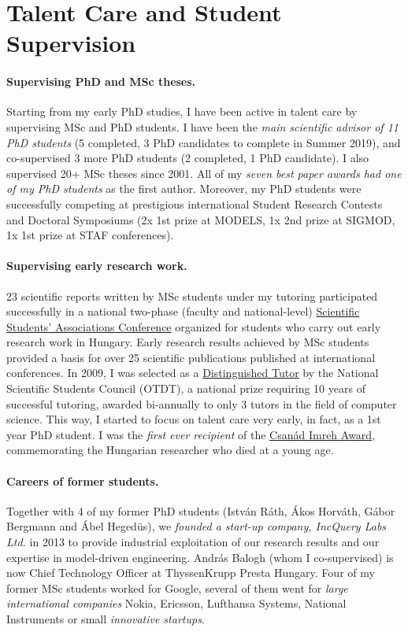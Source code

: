\documentclass[a4paper,11pt]{article}
\begin{document}
\section{Talent Care and Student Supervision}
\paragraph{Supervising PhD and MSc theses.}
Starting from my early PhD studies, I have been active in talent care by supervising MSc and PhD students. I have been the \emph{main scientific advisor of 11 PhD students} (5 completed, 3 PhD candidates to complete in Summer 2019), and co-supervised 3 more PhD students (2 completed, 1 PhD candidate). I also supervised 20+ MSc theses since 2001. All of my \emph{seven best paper awards had one of my PhD students} as the first author. Moreover, my PhD students were successfully competing at prestigious international Student Research Contests and Doctoral Symposiums (2x 1st prize at MODELS, 1x 2nd prize at SIGMOD, 1x 1st prize at STAF conferences).

\paragraph{Supervising early research work.} 
23 scientific reports written by MSc students under my tutoring participated successfully in a national two-phase (faculty and national-level) \href{http://www.otdt.hu/hu/cms/otdk/orszagos-tudomanyos-diakkori-konferencia/}{Scientific Students’ Associations Conference} organized for students who carry out early research work in Hungary. Early research results achieved by MSc students provided a basis for over 25 scientific publications published at international conferences. In 2009, I was selected as a \href{http://www.otdt.hu/page/kituntetesek/mak2009.php}{Distinguished Tutor} by the National Scientific Students Council (OTDT), a national prize requiring 10 years of successful tutoring, awarded bi-annually to only 3 tutors in the field of computer science. This way, I started to focus on talent care very early, in fact, as a 1st year PhD student. I was the \emph{first ever recipient} of the \href{https://otdk2017.mik.uni-pannon.hu/index.php/eredmenyek}{Csanád Imreh Award}, commemorating the Hungarian researcher who died %
at a young age. 

\paragraph{Careers of former students.} Together with 4 of my former PhD students (István Ráth, Ákos Horváth, Gábor Bergmann and Ábel Hegedüs), we \emph{founded a start-up company, IncQuery Labs Ltd.} in 2013 to provide industrial exploitation of our research results and our expertise in model-driven engineering. András Balogh (whom I co-supervised) is now Chief Technology Officer at ThyssenKrupp Presta Hungary. Four of my former MSc students worked for Google, several of them went for \emph{large international companies} Nokia, Ericsson, Lufthansa Systems, National Instruments or small \emph{innovative startups}.
\end{document}
